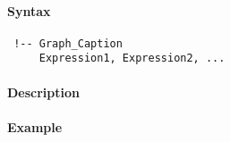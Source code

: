 


	\paragraph{Syntax}
 
 \begin{verbatim}
 !-- Graph_Caption
     Expression1, Expression2, ...
 \end{verbatim}
 
 \paragraph{Description}
 
 \paragraph{Example}


